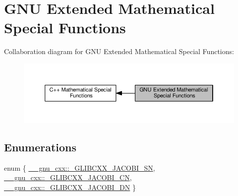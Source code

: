 \hypertarget{group__gnu__math__spec__func}{}\section{G\+N\+U Extended Mathematical Special Functions}
\label{group__gnu__math__spec__func}
Collaboration diagram for G\+N\+U Extended Mathematical Special Functions\+:
\nopagebreak
\begin{figure}[H]
\begin{center}
\leavevmode
\includegraphics[width=350pt]{group__gnu__math__spec__func}
\end{center}
\end{figure}
\subsection*{Enumerations}
\begin{DoxyCompactItemize}
\item 
enum \{ \hyperlink{group__gnu__math__spec__func_ggad6c62dd86a596716cece6ac2d4cfd4b3a3f3a4942031777493cbc33f592c941c7}{\+\_\+\+\_\+gnu\+\_\+cxx\+::\+\_\+\+G\+L\+I\+B\+C\+X\+X\+\_\+\+J\+A\+C\+O\+B\+I\+\_\+\+S\+N}, 
\hyperlink{group__gnu__math__spec__func_ggad6c62dd86a596716cece6ac2d4cfd4b3a86d36c2efbbbfddcfb1e552853d72d65}{\+\_\+\+\_\+gnu\+\_\+cxx\+::\+\_\+\+G\+L\+I\+B\+C\+X\+X\+\_\+\+J\+A\+C\+O\+B\+I\+\_\+\+C\+N}, 
\hyperlink{group__gnu__math__spec__func_ggad6c62dd86a596716cece6ac2d4cfd4b3a4576182edcbe93595def76dd1e61e0f7}{\+\_\+\+\_\+gnu\+\_\+cxx\+::\+\_\+\+G\+L\+I\+B\+C\+X\+X\+\_\+\+J\+A\+C\+O\+B\+I\+\_\+\+D\+N}
 \}
\end{DoxyCompactItemize}
